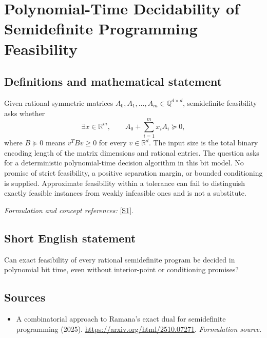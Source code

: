 \documentclass[11pt]{article}
\begin{document}
\section*{\texorpdfstring{Polynomial-Time Decidability of Semidefinite Programming Feasibility}{Polynomial-Time Decidability of Semidefinite Programming Feasibility}}\label{269}
\subsection{Definitions and mathematical statement}
Given rational symmetric matrices $A_0,A_1,\ldots,A_m\in{\mathbb{Q}}^{d\times d}$, semidefinite feasibility asks whether
\[
 \exists x\in{\mathbb{R}}^m,\qquad A_0+\sum_{i=1}^m x_iA_i\succeq0,
\]
where $B\succeq0$ means $v^TBv\ge0$ for every $v\in{\mathbb{R}}^d$. The input size is the total binary encoding length of the matrix dimensions and rational entries. The question asks for a deterministic polynomial-time decision algorithm in this bit model. No promise of strict feasibility, a positive separation margin, or bounded conditioning is supplied. Approximate feasibility within a tolerance can fail to distinguish exactly feasible instances from weakly infeasible ones and is not a substitute.
\par\smallskip\textit{Formulation and concept references:} \href{https://arxiv.org/html/2510.07271}{[S1]}.

\subsection{Short English statement}
Can exact feasibility of every rational semidefinite program be decided in polynomial bit time, even without interior-point or conditioning promises?
\subsection{Sources}
\begin{itemize}
\item[S1]A combinatorial approach to Ramana's exact dual for semidefinite programming (2025).
\url{https://arxiv.org/html/2510.07271}.
\textit{Formulation source.}
\end{itemize}
\end{document}
